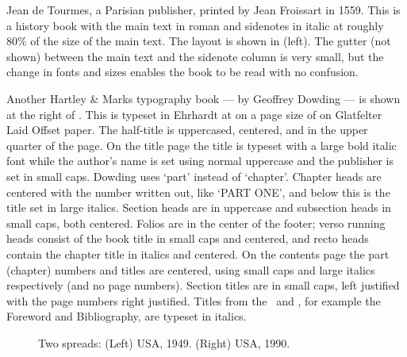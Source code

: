 \documentclass[10pt,a4paper,oneside,extrafontsizes]{memoir}%
\begin{document}
\begin{paracol}{2}
\switchEng
   Jean de Tourmes, a Parisian publisher, 
printed 
by Jean Froissart in 1559. This is a history book with the main text in
roman and sidenotes in italic at roughly 80\% of the size of the main text.
The layout is shown in  (left). The gutter (not shown) between 
the main text and the sidenote column 
is very small, 
but the change in fonts and sizes enables the book to be read with no 
confusion. 


Another Hartley \& Marks typography book ---  by Geoffrey
Dowding --- is shown at the right of
.  This is typeset in Ehrhardt at
 on a page size of  on
Glatfelter Laid Offset paper.  The
half-title is uppercased, centered, and in the upper
quarter of the page. On the title page the title is
typeset with a large bold italic font while the author's name is set
using normal uppercase and the publisher is set in small caps. Dowding
uses `part' instead of `chapter'.  Chapter heads
are centered with the number written out, like `PART ONE', and below
this is the title set in large italics.  Section
heads are in uppercase and subsection heads in small caps, both
centered. Folios are in the center of the
footer; verso running heads
consist of the book title in small caps and centered, and recto heads
contain the chapter title in italics and centered. On the
contents page the part (chapter) numbers and titles
are centered, using small caps and large italics respectively (and no
page numbers). Section titles are in small caps, left justified with
the page numbers right justified. Titles from the \pixfrontmatter\ and
\pixbackmatter, for example the Foreword and Bibliography, are typeset
in italics.
\end{paracol}


\begin{figure}
\centering
\begin{minipage}[b]{\pwlayi}
\end{minipage}
\hfill
\begin{minipage}[b]{\pwlayi}
\end{minipage}
\caption[Two spreads: USA, 1949 and 1990]%
        {Two spreads: (Left) USA, 1949.
         (Right) USA, 1990.} \label{fb:4}
\end{figure}
\end{document}

